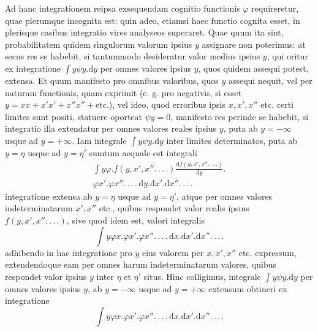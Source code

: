 Ad hanc integrationem reipsa exsequendam cognitio functionis \(\varphi\) requireretur, quae plerumque incognita est: quin adeo, etiamsi haec functio cognita esset, in plerisque casibus integratio vires analyseos superaret. Quae quum ita sint, probabilitatem quidem singulorum valorum ipsius \(y\) assignare non poterimus: at secus res se habebit, si tantummodo desideratur valor medius ipsius \(y\), qui oritur ex integratione \(\int y\psi y.\mathrm{d}y\) per omnes valores ipsius \(y\), quos quidem assequi potest, extensa. Et quum manifesto pro omnibus valoribus, quos \(y\) assequi nequit, vel per naturam functionis, quam exprimit (e. g. pro negativis, si esset \(y=xx+x'x'+x''x''+\text{etc.}\)), vel ideo, quod erroribus ipsis \(x,x',x''\) etc. certi limites sunt positi, statuere oporteat \(\psi y=0\), manifesto res perinde se habebit, si integratio illa extendatur per omnes valores reales ipsius \(y\), puta ab \(y=-\infty\) usque ad \(y=+\infty\). Iam integrale \(\int y\psi y.\mathrm{d}y\) inter limites determinatos, puta ab \(y=\eta\) usque ad \(y=\eta'\) sumtum aequale est integrali
\[
\begin{aligned}
\int y\varphi.f(y,x',x''\mathord{.}\,\mathord{.}\,\mathord{.}\,\mathord{.})\frac{\mathrm{d}f(y,x',x''\mathord{.}\,\mathord{.}\,\mathord{.}\,\mathord{.})}{\mathrm{d}y}.{}\\
\varphi x'.\varphi x''\mathord{.}\,\mathord{.}\,\mathord{.}\,\mathord{.}\,\mathrm{d}y.\mathrm{d}x'.\mathrm{d}x''\mathord{.}\,\mathord{.}\,\mathord{.}\,\mathord{.}
\end{aligned}
\]
integratione extensa ab \(y=\eta\) usque ad \(y=\eta'\), atque per omnes valores indeterminatarum \(x',x''\) etc., quibus respondet valor realis ipsius \(f(y,x',x''\mathord{.}\,\mathord{.}\,\mathord{.}\,\mathord{.})\), sive quod idem est, valori integralis
\[
\int y\varphi x.\varphi x'.\varphi x''\mathord{.}\,\mathord{.}\,\mathord{.}\,\mathord{.}\,\mathrm{d}x.\mathrm{d}x'.\mathrm{d}x''\mathord{.}\,\mathord{.}\,\mathord{.}\,\mathord{.}
\]
adhibendo in hac integratione pro \(y\) eius valorem per \(x,x',x''\) etc. expressum, extendendoque eam per omnes harum indeterminatarum valores, quibus respondet valor ipsius \(y\) inter \(\eta\) et \(\eta'\) situs. Hinc colligimus, integrale \(\int y\psi y.\mathrm{d}y\) per omnes valores ipsius \(y\), ab \(y=-\infty\) usque ad \(y=+\infty\) extensum obtineri ex integratione
\[
\int y\varphi x.\varphi x'.\varphi x''\mathord{.}\,\mathord{.}\,\mathord{.}\,\mathord{.}\,\mathrm{d}x.\mathrm{d}x'.\mathrm{d}x''\mathord{.}\,\mathord{.}\,\mathord{.}\,\mathord{.}
\]
